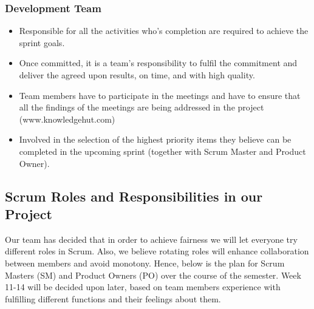 \subsubsection{Development Team}
\begin{itemize}
\item Responsible for all the activities who's completion are required to achieve the sprint goals.
\item Once committed, it is a team's responsibility to fulfil the commitment and deliver the agreed upon results, on time, and with high quality.
\item Team members have to participate in the meetings and have to ensure that all the findings of the meetings are being addressed in the project (www.knowledgehut.com)
\item Involved in the selection of the highest priority items they believe can be completed in the upcoming sprint (together with Scrum Master and Product Owner).
\end{itemize}

\subsection{Scrum Roles and Responsibilities in our Project}
Our team has decided that in order to achieve fairness we will let everyone try different roles in Scrum. Also, we believe rotating roles will enhance collaboration between members and avoid monotony. Hence, below is the plan for Scrum Masters (SM) and Product Owners (PO) over the course of the semester. Week 11-14 will be decided upon later, based on team members experience with fulfilling different functions and their feelings about them.

